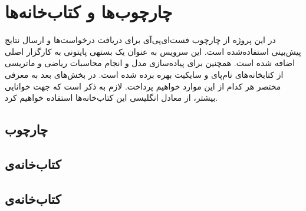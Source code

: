 \section{چارچوب‌ها و کتاب‌خانه‌ها}
در این پروژه از چارچوب فست‌ای‌پی‌آی برای دریافت درخواست‌ها و ارسال نتایج پیش‌بینی استفاده‌شده است. این سرویس به عنوان یک بستهی پایتونی به کارگزار اصلی اضافه شده است. همچنین برای پیاده‌سازی مدل و انجام محاسبات ریاضی و ماتریسی از کتابخانه‌های نام‌پای و سایکیت بهره برده شده است. در بخش‌های بعد به معرفی مختصر هر کدام از این موارد خواهیم پرداخت. لازم به ذکر است که جهت خوانایی بیشتر، از معادل انگلیسی این کتاب‌خانه‌ها استفاده خواهیم کرد.

\subsection{چارچوب }


\subsection{کتاب‌خانه‌ی }


\subsection{کتاب‌خانه‌ی } 